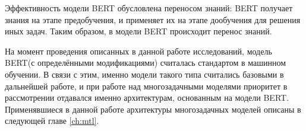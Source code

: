 Эффективность модели BERT обусловлена переносом знаний: BERT получает знания на этапе предобучения, и применяет их на этапе дообучения для решения иных задач. Таким образом, в модели BERT происходит перенос знаний. 

На момент проведения описанных в данной работе исследований, модель BERT(с определёнными модификациями) считалась стандартом в машинном обучении. В связи с этим, именно модели такого типа считались базовыми в дальнейшей работе, и при работе над многозадачными моделями приоритет в рассмотрении отдавался именно архитектурам, основанным на модели BERT. Применявшиеся в данной работе архитектуры многозадачных моделей описаны в следующей главе \ref{ch:mtl}.
